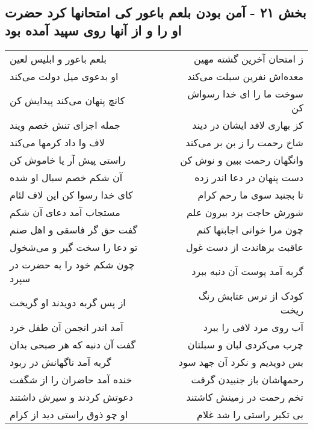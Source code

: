 \begin{center}
\section*{بخش ۲۱ - آمن بودن بلعم باعور کی امتحانها کرد حضرت او را و از آنها روی سپید آمده بود}
\label{sec:sh021}
\begin{longtable}{l p{0.5cm} r}
بلعم باعور و ابلیس لعین
&&
ز امتحان آخرین گشته مهین
\\
او بدعوی میل دولت می‌کند
&&
معده‌اش نفرین سبلت می‌کند
\\
کانچ پنهان می‌کند پیدایش کن
&&
سوخت ما را ای خدا رسواش کن
\\
جمله اجزای تنش خصم ویند
&&
کز بهاری لافد ایشان در دیند
\\
لاف وا داد کرمها می‌کند
&&
شاخ رحمت را ز بن بر می‌کند
\\
راستی پیش آر یا خاموش کن
&&
وانگهان رحمت ببین و نوش کن
\\
آن شکم خصم سبال او شده
&&
دست پنهان در دعا اندر زده
\\
کای خدا رسوا کن این لاف لئام
&&
تا بجنبد سوی ما رحم کرام
\\
مستجاب آمد دعای آن شکم
&&
شورش حاجت بزد بیرون علم
\\
گفت حق گر فاسقی و اهل صنم
&&
چون مرا خوانی اجابتها کنم
\\
تو دعا را سخت گیر و می‌شخول
&&
عاقبت برهاندت از دست غول
\\
چون شکم خود را به حضرت در سپرد
&&
گربه آمد پوست آن دنبه ببرد
\\
از پس گربه دویدند او گریخت
&&
کودک از ترس عتابش رنگ ریخت
\\
آمد اندر انجمن آن طفل خرد
&&
آب روی مرد لافی را ببرد
\\
گفت آن دنبه که هر صبحی بدان
&&
چرب می‌کردی لبان و سبلتان
\\
گربه آمد ناگهانش در ربود
&&
بس دویدیم و نکرد آن جهد سود
\\
خنده آمد حاضران را از شگفت
&&
رحمهاشان باز جنبیدن گرفت
\\
دعوتش کردند و سیرش داشتند
&&
تخم رحمت در زمینش کاشتند
\\
او چو ذوق راستی دید از کرام
&&
بی تکبر راستی را شد غلام
\\
\end{longtable}
\end{center}
